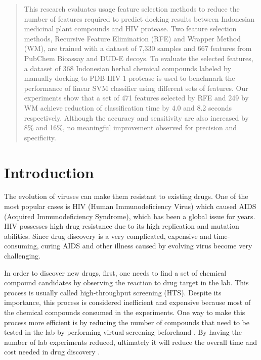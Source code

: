 \documentclass[conference,compsoc,12pt]{IEEEtran}
\begin{document}
	\maketitle
	
	\begin{abstract}
		
		This research evaluates usage feature selection methods to reduce the number of features required to predict docking results between Indonesian medicinal plant compounds and HIV protease. Two feature selection methods, Recursive Feature Elimination (RFE) and Wrapper Method (WM), are trained with a dataset of 7,330 samples and 667 features from PubChem Bioassay and DUD-E decoys. To evaluate the selected features, a dataset of 368 Indonesian herbal chemical compounds labeled by manually docking to PDB HIV-1 protease is used to benchmark the performance of linear SVM classifier using different sets of features. Our experiments show that a set of 471 features selected by RFE and 249 by WM achieve reduction of classification time by 4.0 and 8.2 seconds respectively. Although the accuracy and sensitivity are also increased by 8\% and 16\%, no meaningful improvement observed for precision and specificity.  
		
	\end{abstract}
	
	\IEEEpeerreviewmaketitle
	
	\section{Introduction}
	
	The evolution of viruses can make them resistant to existing drugs. One of the most popular cases is HIV (Human Immunodeficiency Virus) which caused AIDS (Acquired Immunodeficiency Syndrome), which has been a global issue for years. HIV possesses high drug resistance due to its high replication and mutation abilities. Since drug discovery is a very complicated, expensive and time-consuming, curing AIDS and other illness caused by evolving virus become very challenging\cite{yanuar2014virtual}.
	
	In order to discover new drugs, first, one needs to find a set of chemical compound candidates by observing the reaction to drug target in the lab. This process is usually called high-throughput screening (HTS). Despite its importance, this process is considered inefficient and expensive because most of the chemical compounds consumed in the experiments. One way to make this process more efficient is by reducing the number of compounds that need to be tested in the lab by performing virtual screening beforehand \cite{chen2017developing}. By having the number of lab experiments reduced, ultimately it will reduce the overall time and cost needed in drug discovery \cite{korkmaz2014drug}.
	
\end{document}
